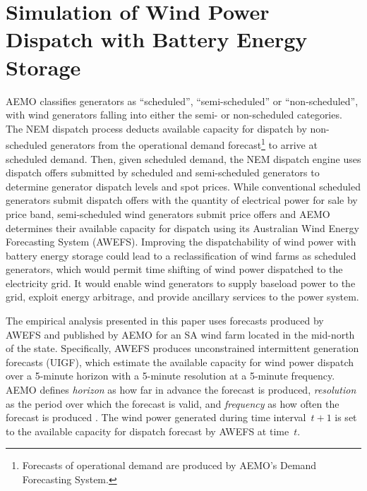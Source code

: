 \section{Simulation of Wind Power Dispatch with Battery Energy Storage}\label{sect:sim_disp_wind_power_bess}
AEMO classifies generators as ``scheduled'', ``semi-scheduled'' or ``non-scheduled'', with wind generators falling into either the semi- or non-scheduled categories.  The NEM dispatch process deducts available capacity for dispatch by non-scheduled generators from the operational demand forecast\footnote{
Forecasts of operational demand are produced by AEMO's Demand Forecasting System.
} to arrive at scheduled demand.  Then, given scheduled demand, the NEM dispatch engine uses dispatch offers submitted by scheduled and semi-scheduled generators to determine generator dispatch levels and spot prices.  While conventional scheduled generators submit dispatch offers with the quantity of electrical power for sale by price band, semi-scheduled wind generators submit price offers and AEMO \citeyearpar{AEMO14b} determines their available capacity for dispatch using its Australian Wind Energy Forecasting System (AWEFS).  Improving the dispatchability of wind power with battery energy storage could lead to a reclassification of wind farms as scheduled generators, which would permit time shifting of wind power dispatched to the electricity grid.  It would enable wind generators to supply baseload power to the grid, exploit energy arbitrage, and provide ancillary services to the power system.

The empirical analysis presented in this paper uses forecasts produced by AWEFS and published by AEMO \citeyearpar{AEMO16} for an SA wind farm located in the mid-north of the state.  Specifically, AWEFS produces unconstrained intermittent generation forecasts (UIGF), which estimate the available capacity for wind power dispatch over a 5-minute horizon with a 5-minute resolution at a 5-minute frequency.  AEMO defines \textit{horizon} as how far in advance the forecast is produced, \textit{resolution} as the period over which the forecast is valid, and \textit{frequency} as how often the forecast is produced \citeyearpar[AEMO,][]{AEMO14b}.  The wind power generated during time interval~$t\!+\!1$ is set to the available capacity for dispatch forecast by AWEFS at time~$t$.


